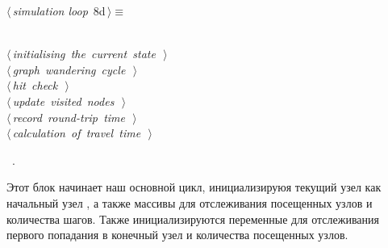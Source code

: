 \documentclass{article}
\begin{document}
\begin{flushleft} \small
\begin{minipage}{\linewidth}\label{scrap4}\raggedright\small
{} $\langle\,${\itshape simulation loop}\nobreak\ {\footnotesize {8d}}$\,\rangle\equiv$
\vspace{-1ex}
\begin{list}{}{} \item
\mbox{}\verb@@\\
\mbox{}\verb@@\hbox{$\langle\,${\itshape initialising the current state}\nobreak\ {\footnotesize {}}$\,\rangle$}\verb@@\\
\mbox{}\verb@@\hbox{$\langle\,${\itshape graph wandering cycle}\nobreak\ {\footnotesize {}}$\,\rangle$}\verb@@\\
\mbox{}\verb@@\hbox{$\langle\,${\itshape hit check}\nobreak\ {\footnotesize {}}$\,\rangle$}\verb@@\\
\mbox{}\verb@@\hbox{$\langle\,${\itshape update visited nodes}\nobreak\ {\footnotesize {}}$\,\rangle$}\verb@@\\
\mbox{}\verb@@\hbox{$\langle\,${\itshape record round-trip time}\nobreak\ {\footnotesize {}}$\,\rangle$}\verb@@\\
\mbox{}\verb@@\hbox{$\langle\,${\itshape calculation of travel time}\nobreak\ {\footnotesize {}}$\,\rangle$}\verb@@\\
\mbox{}\verb@@{\NWsep}
\end{list}
\vspace{-1.5ex}
\footnotesize
\begin{list}{}{\setlength{\itemsep}{-\parsep}\setlength{\itemindent}{-\leftmargin}}
\item \NWtxtMacroRefIn\ .

\item{}
\end{list}
\end{minipage}\vspace{4ex}
\end{flushleft}
Этот блок начинает наш основной цикл, инициализируюя текущий узел как начальный узел , а также массивы для отслеживания посещенных узлов и количества шагов. Также инициализируются переменные для отслеживания первого попадания в конечный узел и количества посещенных узлов.
\end{document}
